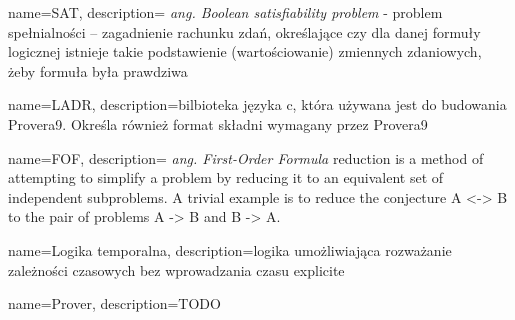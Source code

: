 
 {
    name=SAT,
    description={ \textit{ang. Boolean satisfiability problem} - problem spełnialności – zagadnienie rachunku zdań, określające czy dla danej formuły logicznej istnieje takie podstawienie (wartościowanie) zmiennych zdaniowych, żeby formuła była prawdziwa}
}

 {
    name=LADR,
    description={bilbioteka języka c, która używana jest do budowania Provera9. Określa również format składni wymagany przez Provera9}
}

 {
    name=FOF,
    description={ \textit{ang. First-Order Formula} reduction is a method of attempting to simplify a problem by reducing it to an equivalent set of independent subproblems. A trivial example is to reduce the conjecture A <-> B to the pair of problems A -> B and B -> A.}
}

 {
    name=Logika temporalna,
    description={logika umożliwiająca rozważanie zależności czasowych bez wprowadzania czasu explicite}
}

 {
    name=Prover,
    description={TODO}
}

